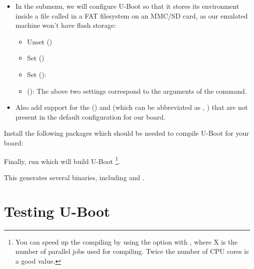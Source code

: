 \begin{itemize}
\item In the  submenu, we will configure U-Boot so
    that it stores its environment inside a file called 
    in a FAT filesystem on an MMC/SD card, as our emulated
    machine won't have flash storage:
    \begin{itemize}
    \item Unset  ()
    \item Set  ()
    \item Set  (): 
    \item {} (): \newline
        The above two settings correspond to the arguments of the
         command.
    \end{itemize}
\item Also add support for the  ()
    and  (which can be abbreviated as , )
    that are not present in the default configuration for our board.
\end{itemize}

Install the following packages which should be needed to compile U-Boot for
your board:


Finally, run 
 which will build U-Boot
\footnote{You can speed up the
compiling by using the  option with , where X
is the number of parallel jobs used for compiling. Twice the
number of CPU cores is a good value.}.

This generates several binaries, including  and
.

\section{Testing U-Boot}

